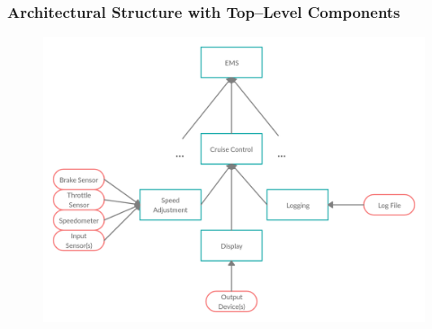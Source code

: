\documentclass{article}
\begin{document}
	\newpage
	\subsubsection{Architectural Structure with Top--Level Components}
	\begin{figure}[!htb]
		\centering
		\includegraphics[scale=.28]{cs347_5b}
	\end{figure}
	
\end{document}
